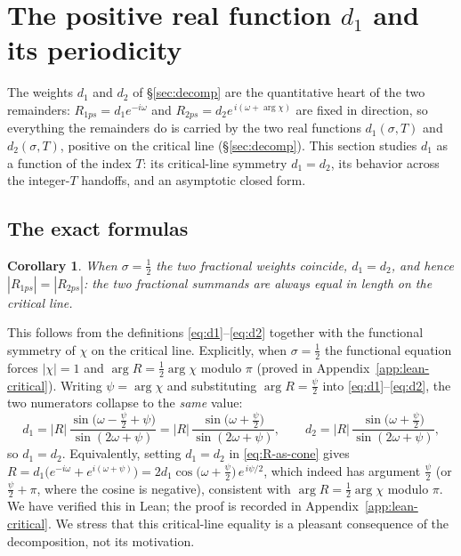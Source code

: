 \documentclass[11pt]{article}
\newtheorem{corollary}[theorem]{Corollary}
\theoremstyle{definition}
\begin{document}
\section{The positive real function \texorpdfstring{$d_1$}{d1} and its periodicity}\label{sec:d1-function}

The weights $d_1$ and $d_2$ of \S\ref{sec:decomp} are the quantitative heart
of the two remainders: $R_{1ps}=d_1e^{-i\omega}$ and
$R_{2ps}=d_2e^{\,i(\omega+\arg\chi)}$ are fixed in direction, so everything
the remainders do is carried by the two real functions
$d_1(\sigma,T)$ and $d_2(\sigma,T)$, positive on the critical line
(\S\ref{sec:decomp}). This section studies $d_1$ as a function
of the index $T$: its critical-line symmetry $d_1=d_2$, its behavior across
the integer-$T$ handoffs, and an asymptotic closed form.

\subsection{The exact formulas}\label{sec:d1-exact}

\begin{corollary}\label{cor:equal}
When $\sigma=\tfrac12$ the two fractional weights coincide, $d_1=d_2$, and
hence $|R_{1ps}| = |R_{2ps}|$: the two fractional summands are always equal
in length on the critical line.
\end{corollary}

This follows from the definitions \eqref{eq:d1}--\eqref{eq:d2} together with the
functional symmetry of $\chi$ on the critical line. Explicitly, when
$\sigma=\tfrac12$ the functional equation forces $|\chi|=1$ and
$\arg R = \tfrac12\arg\chi$ modulo $\pi$ (proved in
Appendix~\ref{app:lean-critical}). Writing $\psi=\arg\chi$ and
substituting $\arg R = \tfrac{\psi}{2}$ into \eqref{eq:d1}--\eqref{eq:d2}, the two
numerators collapse to the \emph{same} value:
\begin{equation}
d_1 = |R|\,\frac{\sin\!\bigl(\omega - \tfrac{\psi}{2} + \psi\bigr)}{\sin(2\omega+\psi)}
    = |R|\,\frac{\sin\!\bigl(\omega + \tfrac{\psi}{2}\bigr)}{\sin(2\omega+\psi)},
\qquad
d_2 = |R|\,\frac{\sin\!\bigl(\omega + \tfrac{\psi}{2}\bigr)}{\sin(2\omega+\psi)},
\end{equation}
so $d_1 = d_2$. Equivalently, setting $d_1=d_2$ in \eqref{eq:R-as-cone} gives
$R = d_1\bigl(e^{-i\omega}+e^{i(\omega+\psi)}\bigr)
   = 2d_1\cos\!\bigl(\omega+\tfrac{\psi}{2}\bigr)\,e^{\,i\psi/2}$,
which indeed has argument $\tfrac{\psi}{2}$ (or $\tfrac{\psi}{2}+\pi$, where the
cosine is negative), consistent with $\arg R=\tfrac12\arg\chi$ modulo $\pi$. We
have verified this in Lean; the proof is recorded in
Appendix~\ref{app:lean-critical}. We stress that this critical-line equality is a pleasant
consequence of the decomposition, not its motivation.
\end{document}
